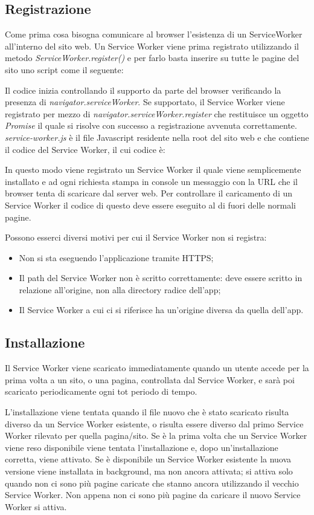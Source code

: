 \documentclass[11pt ,a4paper , twoside , openright ]{book}
\begin{document}
	\subsection{Registrazione}
	
	Come prima cosa bisogna comunicare al browser l’esistenza di un ServiceWorker all’interno del sito web. Un Service Worker viene prima registrato utilizzando il metodo \textit{ServiceWorker.register()} e per farlo basta inserire su tutte le pagine del sito uno script come il seguente:
	
	Il codice inizia controllando il supporto da parte del browser verificando la presenza di \textit{navigator.serviceWorker}. Se supportato, il Service Worker viene registrato per mezzo di \textit{navigator.serviceWorker.register} che restituisce un oggetto \textit{Promise} il quale si risolve con successo a registrazione avvenuta correttamente.
	\textit{service-worker.js} è il file Javascript residente nella root del sito web e che contiene il codice del Service Worker, il cui codice è:
	\pagebreak
	
	In questo modo viene registrato un Service Worker il quale viene semplicemente installato e ad ogni richiesta stampa in console un messaggio con la URL che il browser tenta di scaricare dal server web. Per controllare il caricamento di un Service Worker il codice di questo deve essere eseguito al di fuori delle normali pagine.
	
	Possono esserci diversi motivi per cui il Service Worker non si registra:
	\begin{itemize}
		\item Non si sta eseguendo l'applicazione tramite HTTPS;
		\item Il path del Service Worker non è scritto correttamente: deve essere scritto in relazione all'origine, non alla directory radice dell'app;
		\item Il Service Worker a cui ci si riferisce ha un'origine diversa da quella dell'app.
	\end{itemize}
	
	\subsection{Installazione}
	Il Service Worker viene scaricato immediatamente quando un utente accede per la prima volta a un sito, o una pagina, controllata dal Service Worker, e sarà poi scaricato periodicamente ogni tot periodo di tempo.
	
	L'installazione viene tentata quando il file nuovo che è stato scaricato risulta diverso da un Service Worker esistente, o risulta essere diverso dal primo Service Worker rilevato per quella pagina/sito. Se è la prima volta che un Service Worker viene reso disponibile viene tentata l'installazione e, dopo un'installazione corretta, viene attivato. Se è disponibile un Service Worker esistente la nuova versione viene installata in background, ma non ancora attivata; si attiva solo quando non ci sono più pagine caricate che stanno ancora utilizzando il vecchio Service Worker. Non appena non ci sono più pagine da caricare il nuovo Service Worker si attiva.
	
\end{document}
